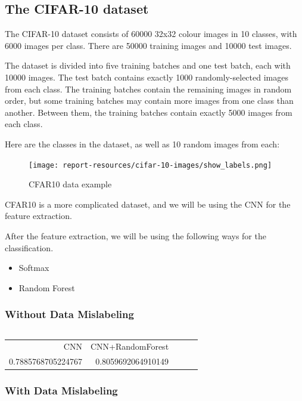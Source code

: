 \documentclass{article}
\begin{document}
\subsection{The CIFAR-10 dataset}
The CIFAR-10 dataset consists of 60000 32x32 colour images in 10 classes, with 6000 images per class. There are 50000 training images and 10000 test images.

The dataset is divided into five training batches and one test batch, each with 10000 images. The test batch contains exactly 1000 randomly-selected images from each class. The training batches contain the remaining images in random order, but some training batches may contain more images from one class than another. Between them, the training batches contain exactly 5000 images from each class.

Here are the classes in the dataset, as well as 10 random images from each:

\begin{figure}[H]
    \centering
    \texttt{[image: report-resources/cifar-10-images/show\_labels.png]}
    \caption{CFAR10 data example \cite{enwiki:1014793182}}
\end{figure}

CFAR10 is a more complicated dataset, and we will be using the CNN for the feature extraction. 

After the feature extraction, we will be using the following ways for the classification. 
\begin{itemize}
    \item Softmax
    \item Random Forest
\end{itemize}

\subsubsection{Without Data Mislabeling}

\inputminted[frame=single,framesep=10pt,fontsize=\footnotesize]{python}{cifar10/main.py}

\begin{table}[H]
    \centering
    \begin{tabular}{rrrrr}
        CNN &  CNN+RandomForest   \\
        0.7885768705224767 &       0.8059692064910149  \\
    \end{tabular}
\end{table}

\subsubsection{With Data Mislabeling}
\end{document}
